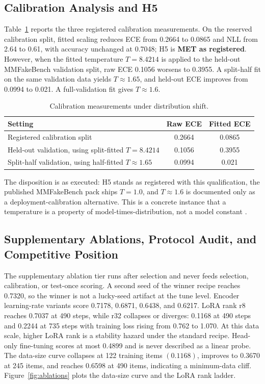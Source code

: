 \documentclass{article} %
\begin{document}
\subsection{Calibration Analysis and H5}
Table~\ref{tab:calib} reports the three registered calibration measurements. On the reserved calibration split, fitted scaling reduces ECE from 0.2664 to 0.0865 and NLL from 2.64 to 0.61, with accuracy unchanged at 0.7048; H5 is \textbf{MET as registered}. However, when the fitted temperature \(T=8.4214\) is applied to the held-out MMFakeBench validation split, raw ECE 0.1056 worsens to 0.3955. A split-half fit on the same validation data yields \(T\approx1.65\), and held-out ECE improves from 0.0994 to 0.021. A full-validation fit gives \(T\approx1.6\).

\begin{table}[t]
\centering
\small
\caption{Calibration measurements under distribution shift.}
\label{tab:calib}
\begin{tabular}{lcc}
\toprule
Setting & Raw ECE & Fitted ECE \\
\midrule
Registered calibration split & 0.2664 & 0.0865 \\
Held-out validation, using split-fitted \(T=8.4214\) & 0.1056 & 0.3955 \\
Split-half validation, using half-fitted \(T\approx1.65\) & 0.0994 & 0.021 \\
\bottomrule
\end{tabular}
\end{table}

The disposition is as executed: H5 stands as registered with this qualification, the published MMFakeBench pack ships \(T=1.0\), and \(T\approx1.6\) is documented only as a deployment-calibration alternative. This is a concrete instance that a temperature is a property of model-times-distribution, not a model constant \citep{Guo2017CalibrationModern, Ovadia2019CanYou, Minderer2021RevisitingCalibration}.

\subsection{Supplementary Ablations, Protocol Audit, and Competitive Position}
The supplementary ablation tier runs after selection and never feeds selection, calibration, or test-once scoring. A second seed of the winner recipe reaches 0.7320, so the winner is not a lucky-seed artifact at the tune level. Encoder learning-rate variants score 0.7178, 0.6871, 0.6438, and 0.6217. LoRA rank r8 reaches 0.7037 at 490 steps, while r32 collapses or diverges: 0.1168 at 490 steps and 0.2244 at 735 steps with training loss rising from 0.762 to 1.070. At this data scale, higher LoRA rank is a stability hazard under the standard recipe. Head-only fine-tuning scores at most 0.4899 and is never described as a linear probe. The data-size curve collapses at 122 training items \((0.1168)\), improves to 0.3670 at 245 items, and reaches 0.6598 at 490 items, indicating a minimum-data cliff. Figure~\ref{fig:ablations} plots the data-size curve and the LoRA rank ladder.
\end{document}
